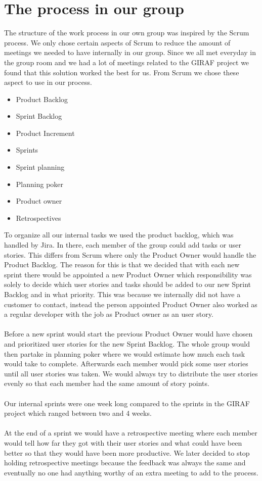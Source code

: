 \section{The process in our group}

The structure of the work process in our own group was inspired by the Scrum process.
We only chose certain aspects of Scrum to reduce the amount of meetings we needed to have internally in our group. 
Since we all met everyday in the group room and we had a lot of meetings related to the GIRAF project we found that this solution worked the best for us.
From Scrum we chose these aspect to use in our process.

 \begin{itemize}
    \item Product Backlog
    \item Sprint Backlog
    \item Product Increment
    \item Sprints
    \item Sprint planning
    \item Planning poker
    \item Product owner
    \item Retrospectives
 \end{itemize}
To organize all our internal tasks we used the product backlog, which was handled by Jira.
In there, each member of the group could add tasks or user stories.
This differs from Scrum where only the Product Owner would handle the Product Backlog.
The reason for this is that we decided that with each new sprint there would be appointed a new Product Owner which responsibility was solely to decide which user stories and tasks should be added to our new Sprint Backlog and in what priority.
This was because we internally did not have a customer to contact, instead the person appointed Product Owner also worked as a regular developer with the job as Product owner as an user story.
\\\\
Before a new sprint would start the previous Product Owner would have chosen and prioritized user stories for the new Sprint Backlog.
The whole group would then partake in planning poker where we would estimate how much each task would take to complete.
Afterwards each member would pick some user stories until all user stories was taken.
We would always try to distribute the user stories evenly so that each member had the same amount of story points.
\\\\
Our internal sprints were one week long compared to the sprints in the GIRAF project which ranged between two and 4 weeks.
\\\\
At the end of a sprint we would have a retrospective meeting where each member would tell how far they got with their user stories and what could have been better so that they would have been more productive.
We later decided to stop holding retrospective meetings because the feedback was always the same and eventually no one had anything worthy of an extra meeting to add to the process.


